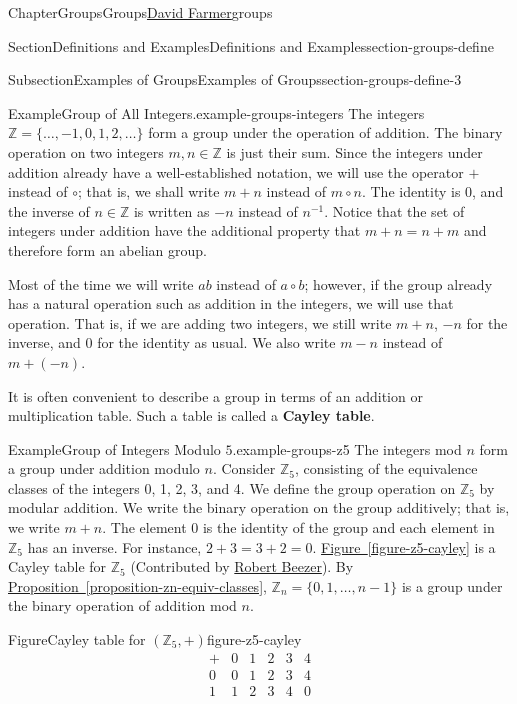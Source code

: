 \documentclass[oneside,10pt,]{book}
\newcommand{\xreffont}{\relax}
\newcommand{\terminology}[1]{\textbf{#1}}
\numberwithin{equation}{section}
\begin{document}
\begin{chapterptx}{Chapter}{Groups}{}{Groups}{\hyperlink{dfarmer}{David Farmer}}{}{groups}
\begin{sectionptx}{Section}{Definitions and Examples}{}{Definitions and Examples}{}{}{section-groups-define}
\begin{subsectionptx}{Subsection}{Examples of Groups}{}{Examples of Groups}{}{}{section-groups-define-3}
\begin{example}{Example}{Group of All Integers.}{example-groups-integers}
The integers \({\mathbb Z } = \{ \ldots , -1, 0, 1, 2, \ldots \}\) form a group under the operation of addition.  The binary operation on two integers \(m, n \in {\mathbb Z}\) is just their sum.  Since the integers under addition already have a well-established notation, we will use the operator \(+\) instead of \(\circ\); that is, we shall write \(m + n\) instead of \(m \circ n\).  The identity is 0, and the inverse of \(n \in {\mathbb Z}\) is written as \(-n\) instead of \(n^{-1}\).  Notice that the set of integers under addition have the additional property that \(m + n = n + m\) and therefore form an abelian group.%
\end{example}
Most of the time we will write \(ab\) instead of \(a \circ b\); however, if the group already has a natural operation such as addition in the integers, we will use that operation.  That is, if we are adding two integers, we still write \(m + n\), \(-n\) for the inverse, and 0 for the identity as usual. We also write \(m - n\) instead of \(m + (-n)\).%
\par
It is often convenient to describe a group in terms of an addition or multiplication table.  Such a table is called a \terminology{Cayley table}.%
\begin{example}{Example}{Group of Integers Modulo \(5\).}{example-groups-z5}%
The integers mod \(n\) form a group under addition modulo \(n\).  Consider \({\mathbb Z}_5\), consisting of the equivalence classes of the integers 0, 1, 2, 3, and 4.  We define the group operation on \({\mathbb Z}_5\) by modular addition.  We write the binary operation on the group additively; that is, we write \(m + n\).  The element 0 is the identity of the group and each element in \({\mathbb Z}_5\) has an inverse. For instance, \(2 + 3 = 3 + 2 = 0\).  \hyperref[figure-z5-cayley]{Figure~{\xreffont\ref{figure-z5-cayley}}} is a Cayley table for \({\mathbb Z}_5\)  (Contributed by \hyperlink{rbeezer}{Robert Beezer}).  By \hyperref[proposition-zn-equiv-classes]{Proposition~{\xreffont\ref{proposition-zn-equiv-classes}}}, \({\mathbb Z}_n = \{0, 1, \ldots, n-1 \}\) is a group under the binary operation of addition mod \(n\).%
\begin{figureptx}{Figure}{Cayley table for \(({\mathbb Z_5}, +)\)}{figure-z5-cayley}{}%
\centering
%
\begin{equation*}
\begin{array}{c|ccccc}
+ & 0 & 1 & 2 & 3 & 4 \\
\hline
0 & 0 & 1 & 2 & 3 & 4 \\
1 & 1 & 2 & 3 & 4 & 0 \\

\end{array}
\end{equation*}
\end{figureptx}
\end{example}
\end{subsectionptx}
\end{sectionptx}
\end{chapterptx}
\end{document}
